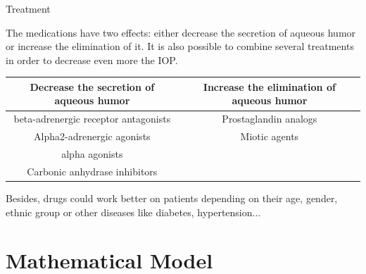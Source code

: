 \documentclass[9pt]{beamer}
\begin{document}
\begin{frame}{Treatment}

The medications have two effects: either decrease the secretion of aqueous humor or increase the elimination of it. It is also possible to combine several treatments in order to decrease even more the IOP.
\newline
\\
\begin{tabular}{|c|c|}
\hline
Decrease the secretion of aqueous humor & Increase the elimination of aqueous humor\\
\hline
beta-adrenergic receptor antagonists & Prostaglandin analogs \\
Alpha2-adrenergic agonists & Miotic agents \\
alpha agonists &  \\
Carbonic anhydrase inhibitors &  \\
\hline
\end{tabular}
\newline
\newline
Besides, drugs could work better on patients depending on their age, gender, ethnic group or other diseases like diabetes, hypertension...

\end{frame}

\section{Mathematical Model}
\end{document}
